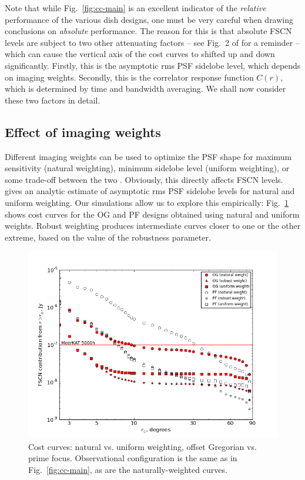 \documentclass{aa}
\begin{document}
Note that while Fig.~\ref{fig:cc-main} is an excellent indicator of the \emph{relative} performance of the various dish designs, one must be very careful when drawing conclusions on \emph{absolute} performance. The reason for this is that absolute FSCN levels are subject to two other attenuating factors -- see Fig.~2 of \citet{SKA54-expa,SKA54} for a reminder -- which can cause the vertical axis of the cost curves to shifted up and down significantly. Firstly, this is the asymptotic rms PSF sidelobe level, which depends on imaging weights. Secondly, this is the correlator response function $C(r)$, which is determined by time and bandwidth averaging. We shall now consider these two factors in detail.

\subsection{Effect of imaging weights}
\label{sec:img-weights}

Different imaging weights can be used to optimize the PSF shape for maximum sensitivity (natural weighting), minimum sidelobe level (uniform weighting), or some trade-off between the two \citep[robust or Briggs weighting:][]{briggs-thesis}. Obviously, this directly affects FSCN levels. \citet{SKA49} gives an analytic estimate of asymptotic rms PSF sidelobe levels for natural and uniform weighting. Our simulations allow us to explore this empirically: Fig.~\ref{fig:cc-weights} shows cost curves for the OG and PF designs obtained using natural and uniform weights. Robust weighting produces intermediate curves closer to one or the other extreme, based on the value of the robustness parameter.

\begin{figure}
  \includegraphics[width=\columnwidth]{cc-mk-nat-vs-uni}
\caption{\label{fig:cc-weights}Cost curves: natural vs. uniform weighting, offset Gregorian vs. prime focus. Observational configuration is the same as in Fig.~\ref{fig:cc-main}, as are the naturally-weighted curves.}
\end{figure}
\end{document}
